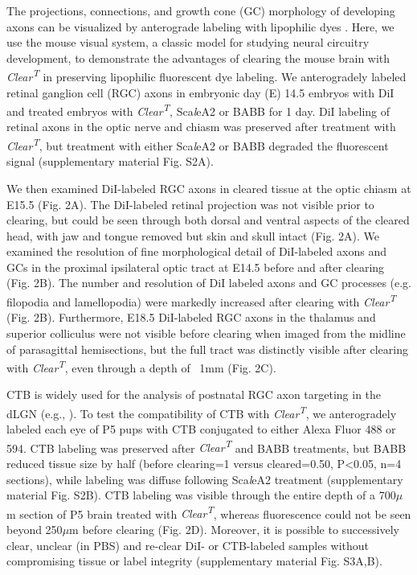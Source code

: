 The projections, connections, and growth cone (GC) morphology of developing axons can be visualized by anterograde labeling with lipophilic dyes \cite{bielle2011emergent,little2009specificity}.
Here, we use the mouse visual system, a classic model for studying neural circuitry development, to demonstrate the advantages of clearing the mouse brain with \emph{Clear\textsuperscript{T}} in preserving lipophilic fluorescent dye labeling.
We anterogradely labeled retinal ganglion cell (RGC) axons in embryonic day (E) 14.5 embryos with DiI and treated embryos with \emph{Clear\textsuperscript{T}}, Sca\emph{l}eA2 or BABB for 1 day.
DiI labeling of retinal axons in the optic nerve and chiasm was preserved after treatment with \emph{Clear\textsuperscript{T}}, but treatment with either Sca\emph{l}eA2 or BABB degraded the fluorescent signal (supplementary material Fig. S2A).

We then examined DiI-labeled RGC axons in cleared tissue at the optic chiasm at E15.5 (Fig. 2A).
The DiI-labeled retinal projection was not visible prior to clearing, but could be seen through both dorsal and ventral aspects of the cleared head, with jaw and tongue removed but skin and skull intact (Fig. 2A).
We examined the resolution of fine morphological detail of DiI-labeled axons and GCs in the proximal ipsilateral optic tract at E14.5 before and after clearing (Fig. 2B).
The number and resolution of DiI labeled axons and GC processes (e.g. filopodia and lamellopodia) were markedly increased after clearing with \emph{Clear\textsuperscript{T}} (Fig. 2B).
Furthermore, E18.5 DiI-labeled RGC axons in the thalamus and superior colliculus were not visible before clearing when imaged from the midline of parasagittal hemisections, but the full tract was distinctly visible after clearing with \emph{Clear\textsuperscript{T}}, even through a depth of ~1mm (Fig. 2C).

CTB is widely used for the analysis of postnatal RGC axon targeting in the dLGN (e.g., ).
To test the compatibility of CTB with \emph{Clear\textsuperscript{T}}, we anterogradely labeled each eye of P5 pups with CTB conjugated to either Alexa Fluor 488 or 594.
CTB labeling was preserved after \emph{Clear\textsuperscript{T}} and BABB treatments, but BABB reduced tissue size by half (before clearing=1 versus cleared=0.50, P<0.05, n=4 sections), while labeling was diffuse following Sca\emph{l}eA2 treatment (supplementary material Fig. S2B).
CTB labeling was visible through the entire depth of a 700$\mu$m section of P5 brain treated with \emph{Clear\textsuperscript{T}}, whereas fluorescence could not be seen beyond 250$\mu$m before clearing (Fig. 2D).
Moreover, it is possible to successively clear, unclear (in PBS) and re-clear DiI- or CTB-labeled samples without compromising tissue or label integrity (supplementary material Fig. S3A,B).
